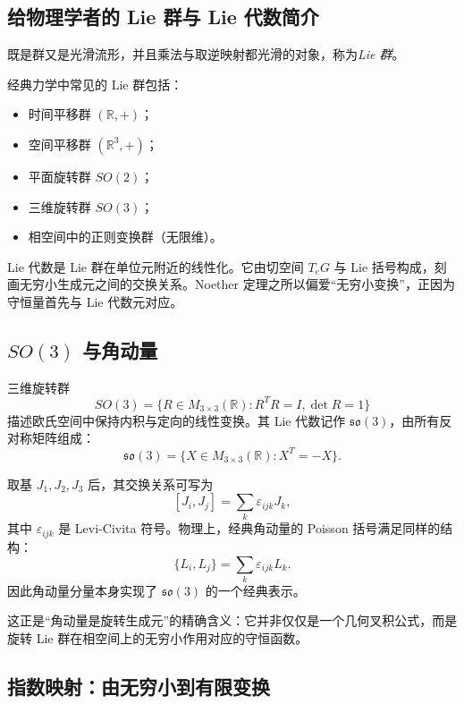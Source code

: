 \subsection{给物理学者的 Lie 群与 Lie 代数简介}

\begin{definition}[Lie 群]
既是群又是光滑流形，并且乘法与取逆映射都光滑的对象，称为\emph{Lie 群}。
\end{definition}

经典力学中常见的 Lie 群包括：
\begin{itemize}
  \item 时间平移群 $(\mathbb R,+)$；
  \item 空间平移群 $(\mathbb R^3,+)$；
  \item 平面旋转群 $SO(2)$；
  \item 三维旋转群 $SO(3)$；
  \item 相空间中的正则变换群（无限维）。
\end{itemize}

Lie 代数是 Lie 群在单位元附近的线性化。它由切空间 $T_eG$ 与 Lie 括号构成，刻画无穷小生成元之间的交换关系。Noether 定理之所以偏爱“无穷小变换”，正因为守恒量首先与 Lie 代数元对应。

\subsection{$SO(3)$ 与角动量}

三维旋转群
\[
  SO(3)=\{R\in M_{3\times 3}(\mathbb R):R^TR=I,\det R=1\}
\]
描述欧氏空间中保持内积与定向的线性变换。其 Lie 代数记作 $\mathfrak{so}(3)$，由所有反对称矩阵组成：
\[
  \mathfrak{so}(3)=\{X\in M_{3\times 3}(\mathbb R):X^T=-X\}.
\]

取基 $J_1,J_2,J_3$ 后，其交换关系可写为
\[
  [J_i,J_j]=\sum_k \varepsilon_{ijk}J_k,
\]
其中 $\varepsilon_{ijk}$ 是 Levi-Civita 符号。物理上，经典角动量的 Poisson 括号满足同样的结构：
\[
  \{L_i,L_j\}=\sum_k \varepsilon_{ijk}L_k.
\]
因此角动量分量本身实现了 $\mathfrak{so}(3)$ 的一个经典表示。

\begin{remark}
这正是“角动量是旋转生成元”的精确含义：它并非仅仅是一个几何叉积公式，而是旋转 Lie 群在相空间上的无穷小作用对应的守恒函数。
\end{remark}

\subsection{指数映射：由无穷小到有限变换}

